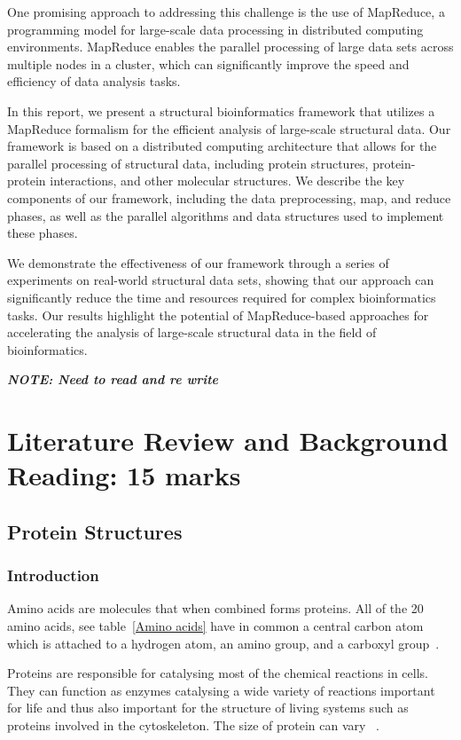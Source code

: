 \documentclass[]{final_report}
\begin{document}
One promising approach to addressing this challenge is the use of MapReduce, a programming model for large-scale data processing in distributed computing environments. MapReduce enables the parallel processing of large data sets across multiple nodes in a cluster, which can significantly improve the speed and efficiency of data analysis tasks.

In this report, we present a structural bioinformatics framework that utilizes a MapReduce formalism for the efficient analysis of large-scale structural data. Our framework is based on a distributed computing architecture that allows for the parallel processing of structural data, including protein structures, protein-protein interactions, and other molecular structures. We describe the key components of our framework, including the data preprocessing, map, and reduce phases, as well as the parallel algorithms and data structures used to implement these phases.

We demonstrate the effectiveness of our framework through a series of experiments on real-world structural data sets, showing that our approach can significantly reduce the time and resources required for complex bioinformatics tasks. Our results highlight the potential of MapReduce-based approaches for accelerating the analysis of large-scale structural data in the field of bioinformatics.

\textbf{\textit{NOTE: Need to read and re write}}





\section{Literature Review and Background Reading: 15 marks}
\subsection{Protein Structures}
\subsubsection{Introduction}

Amino acids are molecules that when combined forms proteins. All of the 20 amino acids, see table~\ref{Amino acids} have in common a central carbon atom which is attached to a hydrogen atom, an amino group, and a carboxyl group~\cite{branden_introduction_1998}.

Proteins are responsible for catalysing most of the chemical reactions in cells. They can function as enzymes catalysing a wide variety of reactions important for life and thus also important for the structure of living systems such as proteins involved in the cytoskeleton. The size of protein can vary ~\cite{zvelebil_understanding_2008}.
\end{document}

